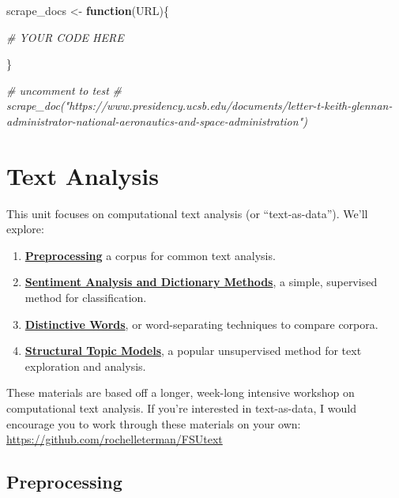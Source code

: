 \documentclass[]{book}
\newenvironment{Shaded}{\begin{snugshade}}{\end{snugshade}}
\newcommand{\CommentTok}[1]{\textcolor[rgb]{0.56,0.35,0.01}{\textit{#1}}}
\newcommand{\ControlFlowTok}[1]{\textcolor[rgb]{0.13,0.29,0.53}{\textbf{#1}}}
\newcommand{\NormalTok}[1]{#1}
\newcommand{\StringTok}[1]{\textcolor[rgb]{0.31,0.60,0.02}{#1}}
\providecommand{\tightlist}{%
  \setlength{\itemsep}{0pt}\setlength{\parskip}{0pt}}
\begin{document}
\begin{Shaded}
\begin{Highlighting}[]
\NormalTok{scrape_docs <-}\StringTok{ }\ControlFlowTok{function}\NormalTok{(URL)\{}

  \CommentTok{# YOUR CODE HERE}
  
\NormalTok{\}}

\CommentTok{# uncomment to test}
\CommentTok{# scrape_doc("https://www.presidency.ucsb.edu/documents/letter-t-keith-glennan-administrator-national-aeronautics-and-space-administration")}
\end{Highlighting}
\end{Shaded}

\hypertarget{text-analysis}{%
\chapter{Text Analysis}\label{text-analysis}}

This unit focuses on computational text analysis (or ``text-as-data''). We'll explore:

\begin{enumerate}
\def\labelenumi{\arabic{enumi}.}
\tightlist
\item
  \textbf{\protect\hyperlink{preprocessing-1}{Preprocessing}} a corpus for common text analysis.
\item
  \textbf{\protect\hyperlink{sentiment-analysis-and-dictionary-methods}{Sentiment Analysis and Dictionary Methods}}, a simple, supervised method for classification.
\item
  \textbf{\protect\hyperlink{distinctive-words}{Distinctive Words}}, or word-separating techniques to compare corpora.
\item
  \textbf{\protect\hyperlink{structural-topic-models}{Structural Topic Models}}, a popular unsupervised method for text exploration and analysis.
\end{enumerate}

These materials are based off a longer, week-long intensive workshop on computational text analysis. If you're interested in text-as-data, I would encourage you to work through these materials on your own: \url{https://github.com/rochelleterman/FSUtext}

\hypertarget{preprocessing}{%
\section{Preprocessing}\label{preprocessing}}
\end{document}
